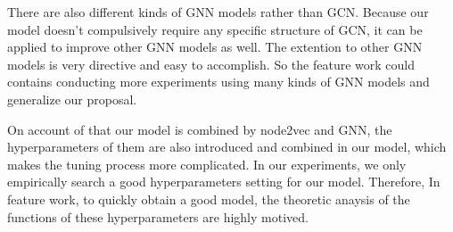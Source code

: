 \documentclass[sigconf]{acmart}
\begin{document}
There are also different kinds of GNN models rather than GCN. Because our model doesn't compulsively require any specific structure of GCN, it can be applied to improve other GNN models as well. The extention to other GNN models is very directive and easy to accomplish. So the feature work could contains conducting more experiments using many kinds of GNN models and generalize our proposal.

On account of that our model is combined by node2vec and GNN, the hyperparameters of them are also introduced and combined in our model, which makes the tuning process more complicated. In our experiments, we only empirically search a good hyperparameters setting for our model. Therefore, In feature work, to quickly obtain a good model, the theoretic anaysis of the functions of these hyperparameters are highly motived.

\begin{acks}
\end{acks}




\end{document}

